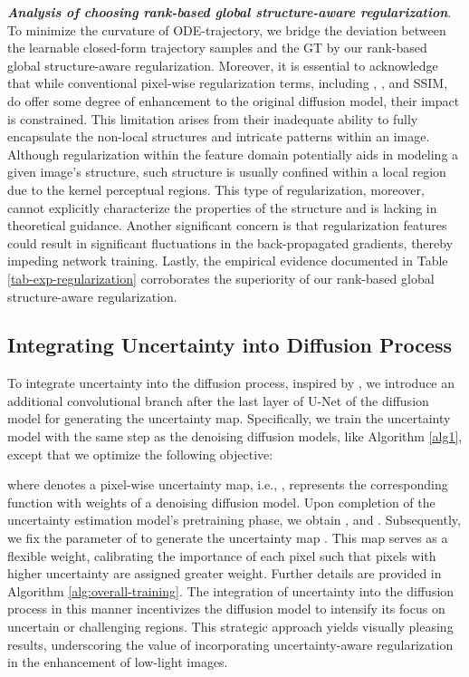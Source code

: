 \documentclass{article}
\begin{document}
\textbf{\emph{Analysis of choosing rank-based global structure-aware regularization}}.
To minimize the curvature of ODE-trajectory, we bridge the deviation between the learnable closed-form trajectory samples  and the GT  by our rank-based global structure-aware regularization. Moreover, it is essential to acknowledge that while conventional pixel-wise regularization terms, including , , and SSIM, do offer some degree of enhancement to the original diffusion model, their impact is constrained. This limitation arises from their inadequate ability to fully encapsulate the non-local structures and intricate patterns within an image.
Although regularization within the feature domain potentially aids in modeling a given image's structure, such structure is usually confined within a local region due to the kernel perceptual regions. This type of regularization, moreover, cannot explicitly characterize the properties of the structure and is lacking in theoretical guidance. Another significant concern is that regularization features could result in significant fluctuations in the back-propagated gradients, thereby impeding network training. Lastly, the empirical evidence documented in Table \ref{tab-exp-regularization} corroborates the superiority of our rank-based global structure-aware regularization.




















\subsection{Integrating Uncertainty into Diffusion Process}


To integrate uncertainty into the diffusion process, inspired by \cite{ning2021uncertainty}, we introduce an additional convolutional branch after the last layer of U-Net of the diffusion model for generating the uncertainty map. Specifically, we train the uncertainty model  with the same step as the denoising diffusion models, like Algorithm \ref{alg1}, except that we optimize the following objective:

where  denotes a pixel-wise uncertainty map, i.e., ,  represents the corresponding function with weights of a denoising diffusion model. Upon completion of the uncertainty estimation model's pretraining phase, we obtain , and . Subsequently, we fix the parameter of  to generate the uncertainty map . This map serves as a flexible weight, calibrating the importance of each pixel such that pixels with higher uncertainty are assigned greater weight. Further details are provided in Algorithm \ref{alg:overall-training}. The integration of uncertainty into the diffusion process in this manner incentivizes the diffusion model to intensify its focus on uncertain or challenging regions. This strategic approach yields visually pleasing results, underscoring the value of incorporating uncertainty-aware regularization in the enhancement of low-light images.
\end{document}
